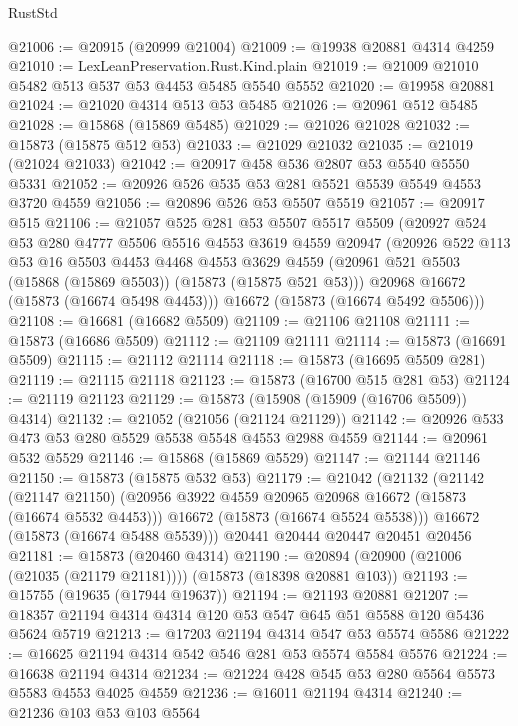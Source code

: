 \begin{lexlean}{RustStd}
\begin{coremodule}
@21006 := @20915 (@20999 @21004)
@21009 := @19938 @20881 @4314 @4259
@21010 := LexLeanPreservation.Rust.Kind.plain
@21019 := @21009 @21010 @5482 @513 @537 @53 @4453 @5485 @5540 @5552
@21020 := @19958 @20881
@21024 := @21020 @4314 @513 @53 @5485
@21026 := @20961 @512 @5485
@21028 := @15868 (@15869 @5485)
@21029 := @21026 @21028
@21032 := @15873 (@15875 @512 @53)
@21033 := @21029 @21032
@21035 := @21019 (@21024 @21033)
@21042 := @20917 @458 @536 @2807 @53 @5540 @5550 @5331
@21052 := @20926 @526 @535 @53 @281 @5521 @5539 @5549 @4553 @3720 @4559
@21056 := @20896 @526 @53 @5507 @5519
@21057 := @20917 @515
@21106 := @21057
    @525
    @281
    @53
    @5507
    @5517
    @5509
    (@20927
      @524
      @53
      @280
      @4777
      @5506
      @5516
      @4553
      @3619
      @4559
      @20947
      (@20926
        @522
        @113
        @53
        @16
        @5503
        @4453
        @4468
        @4553
        @3629
        @4559
        (@20961 @521 @5503 (@15868 (@15869 @5503)) (@15873 (@15875 @521 @53)))
        @20968
        @16672
        (@15873 (@16674 @5498 @4453)))
      @16672
      (@15873 (@16674 @5492 @5506)))
@21108 := @16681 (@16682 @5509)
@21109 := @21106 @21108
@21111 := @15873 (@16686 @5509)
@21112 := @21109 @21111
@21114 := @15873 (@16691 @5509)
@21115 := @21112 @21114
@21118 := @15873 (@16695 @5509 @281)
@21119 := @21115 @21118
@21123 := @15873 (@16700 @515 @281 @53)
@21124 := @21119 @21123
@21129 := @15873 (@15908 (@15909 (@16706 @5509)) @4314)
@21132 := @21052 (@21056 (@21124 @21129))
@21142 := @20926 @533 @473 @53 @280 @5529 @5538 @5548 @4553 @2988 @4559
@21144 := @20961 @532 @5529
@21146 := @15868 (@15869 @5529)
@21147 := @21144 @21146
@21150 := @15873 (@15875 @532 @53)
@21179 := @21042
    (@21132
      (@21142
        (@21147 @21150)
        (@20956 @3922 @4559 @20965 @20968 @16672 (@15873 (@16674 @5532 @4453)))
        @16672
        (@15873 (@16674 @5524 @5538)))
      @16672
      (@15873 (@16674 @5488 @5539)))
    @20441
    @20444
    @20447
    @20451
    @20456
@21181 := @15873 (@20460 @4314)
@21190 := @20894 (@20900 (@21006 (@21035 (@21179 @21181)))) (@15873 (@18398 @20881 @103))
@21193 := @15755 (@19635 (@17944 @19637))
@21194 := @21193 @20881
@21207 := @18357 @21194 @4314 @4314 @120 @53 @547 @645 @51 @5588 @120 @5436 @5624 @5719
@21213 := @17203 @21194 @4314 @547 @53 @5574 @5586
@21222 := @16625 @21194 @4314 @542 @546 @281 @53 @5574 @5584 @5576
@21224 := @16638 @21194 @4314
@21234 := @21224 @428 @545 @53 @280 @5564 @5573 @5583 @4553 @4025 @4559
@21236 := @16011 @21194 @4314
@21240 := @21236 @103 @53 @103 @5564

\end{coremodule}
\end{lexlean}
